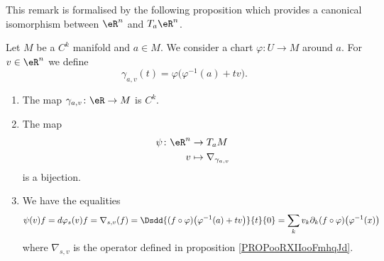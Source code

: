 This remark is formalised by the following proposition which provides a canonical isomorphism between \( \eR^n\) and \( T_a\eR^n\).

\begin{proposition}     \label{PROPooRXIIooFmhqJd}
	Let \( M\) be a \( C^k\) manifold and \( a\in M\). We consider a chart \( \varphi\colon U\to M\) around \( a\). For \( v\in \eR^n\) we define
	\begin{equation}
		\gamma_{a,v}(t)=\varphi\big( \varphi^{-1}(a)+tv \big).
	\end{equation}
	\begin{enumerate}
		\item
		      The map \( \gamma_{a,v}\colon \eR\to M\) is \( C^k\).
		\item
		      The map
		      \begin{equation}
			      \begin{aligned}
				      \psi\colon \eR^n & \to T_aM                      \\
				      v                & \mapsto \nabla_{\gamma_{a,v}}
			      \end{aligned}
		      \end{equation}
		      is a bijection.
		\item
		      We have the equalities
		      \begin{equation}
			      \psi(v)f=d\varphi_s(v)f=\nabla_{s,v}(f)=\Dsdd{ (f\circ\varphi)\big( \varphi^{-1}(a)+tv \big) }{t}{0}=\sum_kv_k\partial_k(f\circ\varphi)\big( \varphi^{-1}(x) \big)
		      \end{equation}
		      where \( \nabla_{s,v}\) is the operator defined in proposition \ref{PROPooRXIIooFmhqJd}.
	\end{enumerate}
\end{proposition}

